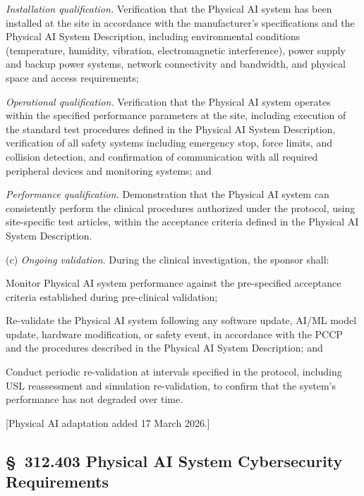 \begin{description}[leftmargin=0.8cm,style=sameline]
\item[(1)] \textit{Installation qualification.} Verification that the Physical AI system has been installed at the site in accordance with the manufacturer's specifications and the Physical AI System Description, including environmental conditions (temperature, humidity, vibration, electromagnetic interference), power supply and backup power systems, network connectivity and bandwidth, and physical space and access requirements;
\item[(2)] \textit{Operational qualification.} Verification that the Physical AI system operates within the specified performance parameters at the site, including execution of the standard test procedures defined in the Physical AI System Description, verification of all safety systems including emergency stop, force limits, and collision detection, and confirmation of communication with all required peripheral devices and monitoring systems; and
\item[(3)] \textit{Performance qualification.} Demonstration that the Physical AI system can consistently perform the clinical procedures authorized under the protocol, using site-specific test articles, within the acceptance criteria defined in the Physical AI System Description.
\end{description}

(c) \textit{Ongoing validation.} During the clinical investigation, the sponsor shall:

\begin{description}[leftmargin=0.8cm,style=sameline]
\item[(1)] Monitor Physical AI system performance against the pre-specified acceptance criteria established during pre-clinical validation;
\item[(2)] Re-validate the Physical AI system following any software update, AI/ML model update, hardware modification, or safety event, in accordance with the PCCP and the procedures described in the Physical AI System Description; and
\item[(3)] Conduct periodic re-validation at intervals specified in the protocol, including USL reassessment and simulation re-validation, to confirm that the system's performance has not degraded over time.
\end{description}

[Physical AI adaptation added 17 March 2026.]

\subsection{\S~312.403 Physical AI System Cybersecurity Requirements}


